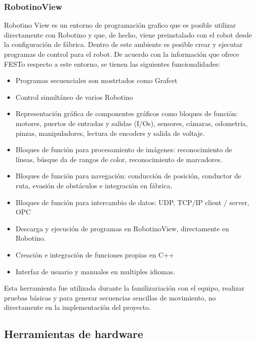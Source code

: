             \cite{ROS_concepts_MoveIt}
             
            \subsubsection{RobotinoView}
            Robotino View es un entorno de programación grafico que es posible utilizar directamente con Robotino y que, de hecho, viene preinstalado con el robot desde la configuración de fábrica. Dentro de este ambiente es posible crear y ejecutar programas de control para el robot.
            De acuerdo con la información que ofrece FESTo respecto a este entorno, se tienen las siguientes funcionalidades:
            \begin{itemize}
                \item Programas secuenciales son mostrtados como Grafcet
                \item Control simultáneo de varios Robotino
                \item Representación gráfica de componentes gráficos como bloques de función: motores, puertos de entradas y salidas (I/Os), sensores, cámaras, odometría, pinzas, manipuladores, lectura de encoders y salida de voltaje.
                \item Bloques de función para procesamiento de imágenes: reconocimiento de líneas, búsque da de rangos de color, reconocimiento de marcadores.
                \item Bloques de función para navegación: conducción de posición, conductor de ruta, evasión de obstáculos e integración en fábrica.
                \item Bloques de función para intercambio de datos: UDP, TCP/IP client / server, OPC
                \item Descarga y ejecución de programas en RobotinoView, directamente en Robotino.
                \item Creación e integración de funciones propias en C++
                \item Interfaz de usuario y manuales en multiples idiomas.
            \end{itemize} \cite{FESTO-RobotinoView}

            Esta herramienta fue utilizada durante la familizariación con el equipo, realizar pruebas básicas y para generar secuencias sencillas de movimiento, no directamente en la implementación del proyecto.
            
        \subsection{Herramientas de hardware}
